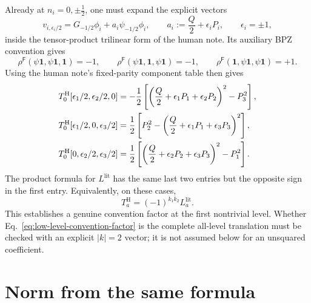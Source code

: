 \documentclass[11pt]{article}
\newcommand{\Ff}{\mathsf F}
\newcommand{\one}{\mathbf 1}
\begin{document}
Already at \(n_i=0,\pm\tfrac12\), one must expand the explicit vectors
\begin{equation}
 v_{i,\epsilon_i/2}
 =G_{-1/2}\phi_i+a_i \psi_{-1/2}\phi_i,
 \qquad
 a_i:=\frac Q2+\epsilon_iP_i,
 \qquad \epsilon_i=\pm1,
 \label{eq:level-half-vectors-a}
\end{equation}
inside the tensor-product trilinear form of the human note.  Its auxiliary
BPZ convention gives
\begin{equation}
 \rho^{\Ff}(\psi\one,\psi\one,\one)=-1,
 \qquad
 \rho^{\Ff}(\psi\one,\one,\psi\one)=-1,
 \qquad
 \rho^{\Ff}(\one,\psi\one,\psi\one)=+1.
 \label{eq:fermion-level-half-rhos}
\end{equation}
Using the human note's fixed-parity component table then gives
\begin{align}
 T_0^{\mathrm H}[\epsilon_1/2,\epsilon_2/2,0]
 &=-\frac12\left[
  \left(\frac Q2+\epsilon_1P_1+\epsilon_2P_2\right)^2-P_3^2
 \right],
 \notag\\
 T_0^{\mathrm H}[\epsilon_1/2,0,\epsilon_3/2]
 &=\frac12\left[
  P_2^2-\left(\frac Q2+\epsilon_1P_1+\epsilon_3P_3\right)^2
 \right],
 \notag\\
 T_0^{\mathrm H}[0,\epsilon_2/2,\epsilon_3/2]
 &=\frac12\left[
  \left(\frac Q2+\epsilon_2P_2+\epsilon_3P_3\right)^2-P_1^2
 \right].
 \label{eq:human-two-branch-direct}
\end{align}
The product formula for \(L^{\mathrm{lit}}\) has the same last two entries
but the opposite sign in the first entry.  Equivalently, on these cases,
\begin{equation}
 T_a^{\mathrm H}=(-1)^{k_1k_2}L_a^{\mathrm{lit}}.
 \label{eq:low-level-convention-factor}
\end{equation}
This establishes a genuine convention factor at the first nontrivial level.
Whether Eq.~\eqref{eq:low-level-convention-factor} is the complete all-level
translation must be checked with an explicit
\(|k|=2\) vector; it is not assumed below for an unsquared coefficient.

\section{Norm from the same formula}
\end{document}
